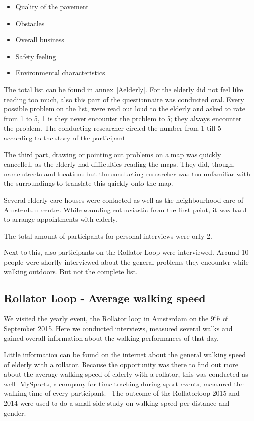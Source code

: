 \begin{itemize}
\item Quality of the pavement
\item Obstacles
\item Overall business
\item Safety feeling
\item Environmental characteristics
\end{itemize}

The total list can be found in annex~\ref{Aelderly}. For the elderly did not feel like reading too much, also this part of the questionnaire was conducted oral. Every possible problem on the list, were read out loud to the elderly and asked to rate from 1 to 5, 1 is they never encounter the problem to 5; they always encounter the problem. The conducting researcher circled the number from 1 till 5 according to the story of the participant. 

The third part, drawing or pointing out problems on a map was quickly cancelled, as the elderly had difficulties reading the maps. They did, though, name streets and locations but the conducting researcher was too unfamiliar with the surroundings to translate this quickly onto the map. 

Several elderly care houses were contacted as well as the neighbourhood care of Amsterdam centre. While sounding enthusiastic from the first point, it was hard to arrange appointments with elderly. 

The total amount of participants for personal interviews were only 2. 

Next to this, also participants on the Rollator Loop were interviewed. Around 10 people were shortly interviewed about the general problems they encounter while walking outdoors. But not the complete list. 

\subsection{Rollator Loop - Average walking speed}
We visited the yearly event, the Rollator loop in Amsterdam on the $9^th$ of September 2015. Here we conducted interviews, measured several walks and gained overall information about the walking performances of that day. 

Little information can be found on the internet about the general walking speed of elderly with a rollator. Because the opportunity was there to find out more about the average walking speed of elderly with a rollator, this was conducted as well. MySports, a company for time tracking during sport events, measured the walking time of every participant.~\cite{mysports} The outcome of the Rollatorloop 2015 and 2014 were used to do a small side study on walking speed per distance and gender. 